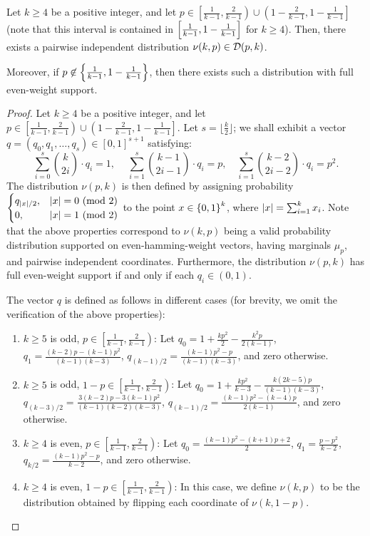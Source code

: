 \begin{lemma}\label{lemma:ub_case_analysis}
	Let $k\geq 4$ be a positive integer, and let $p \in \left[\frac{1}{k-1}, \frac{2}{k-1}\right)\cup \left( 1-\frac{2}{k-1}, 1-\frac{1}{k-1}\right]$ (note that this interval is contained in $\left[ \frac{1}{k-1},1-\frac{1}{k-1} \right]$ for $k\geq 4$). 
	Then, there exists a pairwise independent distribution $\nu (k,p)\in \mathcal D(p,k)$.
	
	Moreover, if $p\not\in \left\{ \frac{1}{k-1}, 1-\frac{1}{k-1} \right\}$, then there exists such a distribution with full even-weight support.
\end{lemma}
\begin{proof}
	Let $k\geq 4$ be a positive integer, and let $p \in \left[\frac{1}{k-1}, \frac{2}{k-1}\right)\cup \left( 1-\frac{2}{k-1}, 1-\frac{1}{k-1}\right]$.
	Let $s = \lfloor\frac{k}{2}\rfloor$; we shall exhibit a vector  $q = (q_0,q_1,\dots,q_s) \in [0,1]^{s+1}$ satisfying:
	\[
		\sum_{i=0}^s \binom{k}{2i}\cdot  q_i = 1,\ \quad\sum_{i=1}^s \binom{k-1}{2i-1}\cdot q_i = p,\quad \sum_{i=1}^s \binom{k-2}{2i-2}\cdot q_i = p^2.
	\]
	The distribution $\nu(p,k)$ is then defined 	by assigning probability $\begin{cases} q_{\left|x\right|/2},& \left|x\right|=0\textnormal{ (mod 2)}\\0,& \left|x\right|=1\textnormal{ (mod 2)} \end{cases}$ to the point $x\in \left\{ 0,1 \right\}^k$, where $\left|x\right| = \sum_{i=1}^k x_i$.
	Note that the above properties correspond to $\nu(k,p)$ being a valid probability distribution supported on even-hamming-weight vectors, having marginals $\mu_p$, and pairwise independent coordinates.
	Furthermore, the distribution $\nu(p,k)$ has full even-weight support if and only if each $q_i \in (0,1)$.
	
	The vector $q$ is defined as follows in different cases (for brevity, we omit the verification of the above properties):
	\begin{enumerate}
		\item $k\geq 5$ is odd,  $p \in \left[\frac{1}{k-1}, \frac{2}{k-1}\right)$: Let $q_0 = 1 + \frac{kp^2}{2} - \frac{k^2p}{2(k-1)}$, $q_1 = \frac{(k-2)p-(k-1)p^2}{(k-1)(k-3)}$, $q_{(k-1)/2} = \frac{(k-1)p^2-p}{(k-1)(k-3)}$, and zero otherwise.
		\item $k\geq 5$ is odd,  $1-p\in \left[\frac{1}{k-1}, \frac{2}{k-1}\right)$: Let $q_0 = 1 + \frac{kp^2}{k-3} - \frac{k(2k-5)p}{(k-1)(k-3)}$, $q_{(k-3)/2} = \frac{3(k-2)p-3(k-1)p^2}{(k-1)(k-2)(k-3)}$, $q_{(k-1)/2} = \frac{(k-1)p^2-(k-4)p}{2(k-1)}$, and zero otherwise.
		\item $k\geq 4$ is even,  $p\in \left[\frac{1}{k-1}, \frac{2}{k-1}\right)$: Let $q_0 = \frac{(k-1)p^2-(k+1)p+2}{2}$,  $q_1 = \frac{p-p^2}{k-2}$, $q_{k/2} = \frac{(k-1)p^2-p}{k-2}$, and zero otherwise.
		\item $k\geq 4$ is even, $1-p\in \left[\frac{1}{k-1}, \frac{2}{k-1}\right)$: In this case, we define $\nu(k,p)$ to be the distribution obtained by flipping each coordinate of $\nu(k,1-p)$.
	\end{enumerate}
	

\end{proof}
